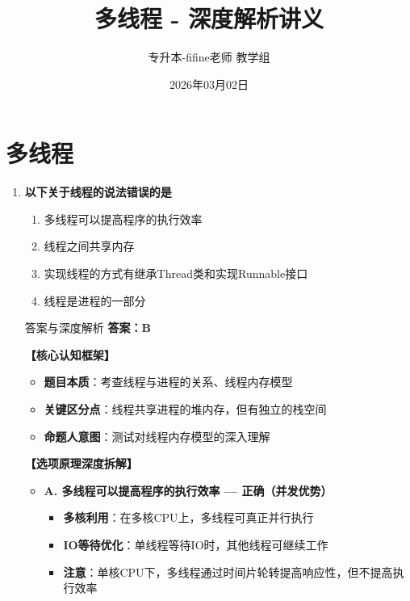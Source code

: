 \documentclass[12pt, a4paper]{ctexart}
\title{\textcolor{myblue}{\textbf{多线程 - 深度解析讲义}}}
\author{专升本-fifine老师 教学组}
\date{2026年03月02日}
\begin{document}
\maketitle
\thispagestyle{empty}
\newpage

\section{多线程}

\begin{enumerate}[label=\textbf{\arabic*.}]

	\item \textbf{以下关于线程的说法错误的是}
	      \begin{enumerate}[label=\Alph*.]
		      \item 多线程可以提高程序的执行效率
		      \item 线程之间共享内存
		      \item 实现线程的方式有继承Thread类和实现Runnable接口
		      \item 线程是进程的一部分
	      \end{enumerate}

	      \begin{bluebox}{答案与深度解析}
		      \textbf{答案：B}

		      \textbf{【核心认知框架】}
		      \begin{itemize}[label={}, leftmargin=*, nosep]
			      \item \textbf{题目本质}：考查线程与进程的关系、线程内存模型
			      \item \textbf{关键区分点}：线程共享进程的堆内存，但有独立的栈空间
			      \item \textbf{命题人意图}：测试对线程内存模型的深入理解
		      \end{itemize}

		      \textbf{【选项原理深度拆解】}
					  \begin{itemize}[label={}, leftmargin=*, nosep]

		      \item \textbf{A. 多线程可以提高程序的执行效率 — 正确（并发优势）}
		      \begin{itemize}[label={}, leftmargin=*, nosep]
			      \item \textbf{多核利用}：在多核CPU上，多线程可真正并行执行
			      \item \textbf{IO等待优化}：单线程等待IO时，其他线程可继续工作
			      \item \textbf{注意}：单核CPU下，多线程通过时间片轮转提高响应性，但不提高执行效率
		      \end{itemize}


\end{itemize}
\end{bluebox}
\end{enumerate}
\end{document}
